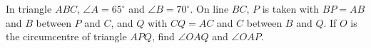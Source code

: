 In triangle $ABC$, $\angle A=65^\circ$ and $\angle B=70^\circ$. On line $BC$, $P$ is taken with $BP=AB$ and $B$ between $P$ and $C$, and $Q$ with $CQ=AC$ and $C$ between $B$ and $Q$. If $O$ is the circumcentre of triangle $APQ$, find $\angle OAQ$ and $\angle OAP$.
